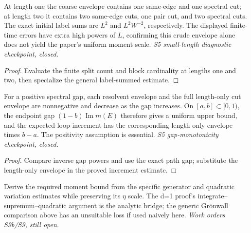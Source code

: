 \begin{lemma}
  \label{lem:loop-hierarchy-length-envelope-small}
  \leanok
  At length one the coarse envelope contains one same-edge and one
  spectral cut; at length two it contains two same-edge cuts, one
  pair cut, and two spectral cuts. The exact initial label sums are
  $L^2$ and $L^2W^{-2}$, respectively. The displayed finite-time errors
  have extra high powers of $L$, confirming this crude envelope alone
  does not yield the paper's uniform moment scale.
  \emph{S5 small-length diagnostic checkpoint, closed.}
\end{lemma}
\begin{proof}\leanok
  Evaluate the finite split count and block cardinality at lengths
  one and two, then specialize the general label-summed estimate.
\end{proof}

\begin{lemma}
  \label{lem:loop-hierarchy-length-envelope-monotone}
  \leanok
  For a positive spectral gap, each resolvent envelope and the full
  length-only cut envelope are nonnegative and decrease as the gap
  increases. On $[a,b]\subset[0,1)$, the endpoint gap
  $(1-b)\operatorname{Im}m(E)$ therefore gives a uniform upper bound,
  and the expected-loop increment has the corresponding length-only
  envelope times $b-a$. The positivity assumption is essential.
  \emph{S5 gap-monotonicity checkpoint, closed.}
\end{lemma}
\begin{proof}\leanok
  Compare inverse gap powers and use the exact path gap; substitute
  the length-only envelope in the proved increment estimate.
\end{proof}

\begin{lemma}\label{lem:gronwall}
  Derive the required moment bound from the specific generator and quadratic
  variation estimates while preserving its $\eta$ scale.  The d=1 proof's
  integrate--supremum--quadratic argument is the analytic bridge; the generic
  Gr\"onwall comparison above has an unsuitable loss if used naively here.
  \emph{Work orders S9b/S9, still open.}
\end{lemma}

